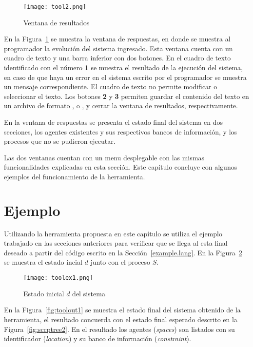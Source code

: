 \begin{figure}[htbp] %
   \centering
   \texttt{[image: tool2.png]} 
   \caption{Ventana de resultados}
   \label{fig:tool2}
\end{figure}

En la Figura~\ref{fig:tool2} se muestra la ventana de respuestas, en donde se muestra al programador la evoluci\'on del sistema ingresado. Esta ventana cuenta con un cuadro de texto y una barra inferior con dos botones. En el cuadro de texto identificado con el n\'umero \textbf{1} se muestra el resultado de la ejecuci\'on del sistema, en caso de que haya un error en el sistema escrito por el programador se muestra un mensaje correspondiente. El cuadro de texto no permite modificar o seleccionar el texto. Los botones \textbf{2} y \textbf{3} permiten guardar el contenido del texto en un archivo de formato ,  o , y cerrar la ventana de resultados, respectivamente.

En la ventana de respuestas se presenta el estado final del sistema en dos secciones, los agentes existentes y sus respectivos bancos de informaci\'on, y los procesos que no se pudieron ejecutar. 

Las dos ventanas cuentan con un menu desplegable con las mismas funcionalidades explicadas en esta secci\'on. Este cap\'itulo concluye con algunos ejemplos del funcionamiento de la herramienta.

\section{Ejemplo}
\label{example.envir}

Utilizando la herramienta propuesta en este cap\'itulo se utiliza el ejemplo trabajado en las secciones anteriores para verificar que se llega al esta final deseado a partir del c\'odigo escrito en la Secci\'on~\ref{example.lang}. En la Figura~\ref{fig:toolin1} se muestra el estado incial $d$ junto con el proceso $S$.

\begin{figure}[htbp] %
   \centering
   \texttt{[image: toolex1.png]} 
   \caption{Estado inicial $d$ del sistema}
   \label{fig:toolin1}
\end{figure}

En la Figura~\ref{fig:toolout1} se muestra el estado final del sistema obtenido de la herramienta, el resultado concuerda con el estado final esperado descrito en la Figura~\ref{fig:sccptree2}. En el resultado los agentes (\textit{spaces}) son listados con su identificador (\textit{location}) y su banco de informaci\'on (\textit{constraint}). 

